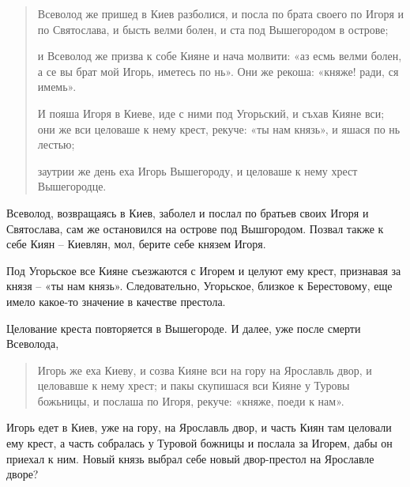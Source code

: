 \begin{quotation}
Всеволод же пришед в Киев разболися, и посла по брата своего по Игоря и по Святослава, и бысть велми болен, и ста под Вышегородом в острове;

и Всеволод же призва к собе Кияне и нача молвити: «аз есмь велми болен, а се вы брат мой Игорь, иметесь по нь». Они же рекоша: «княже! ради, ся имемь».

И пояша Игоря в Киеве, иде с ними под Угорьский, и съхав Кияне вси; они же вси целоваше к нему крест, рекуче: «ты нам князь», и яшася по нь лестью;

заутрии же день еха Игорь Вышегороду, и целоваше к нему хрест Вышегородце.



\end{quotation}

Всеволод, возвращаясь в Киев, заболел и послал по братьев своих Игоря и Святослава, сам же остановился на острове под Вышгородом. Позвал также к себе Киян – Киевлян, мол, берите себе князем Игоря.

Под Угорьское все Кияне съезжаются с Игорем и целуют ему крест, признавая за князя – «ты нам князь». Следовательно, Угорьское, близкое к Берестовому, еще имело какое-то значение в качестве престола.

Целование креста повторяется в Вышегороде. И далее, уже после смерти Всеволода, 

\begin{quotation}
Игорь же еха Киеву, и созва Кияне вси на гору на Ярославль двор, и целовавше к нему хрест; и пакы скупишася вси Кияне у Туровы божьницы, и послаша по Игоря, рекуче: «княже, поеди к нам».
\end{quotation}

Игорь едет в Киев, уже на гору, на Ярославль двор, и часть Киян там целовали ему крест, а часть собралась у Туровой божницы и послала за Игорем, дабы он приехал к ним. Новый князь выбрал себе новый двор-престол на Ярославле дворе? 

